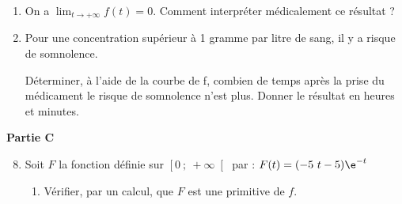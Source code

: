 \begin{exercice_cours}[\quad]{}
\begin{enumerate}
	\begin{enumerate}
		\item Déterminer $f'(t)$.\hfill\reponseLigne[7cm]{}   
		
		\item Résoudre sur $\left[0~;~+\infty\right[$ : $f'(t)=0$ \hfill\reponseLigne[7cm]{}   
		
		\item \hspace*{4.2cm}$f'(t)\geq 0$ \hfill \reponseLigne[7cm]{}    
		
		\item Compléter alors le tableau de variation complet de la fonction $f$ sur $\left[0~;~+\infty\right[$ :
		
		{\it \small On fera figurer les valeurs au bout des flèches}
		
		\begin{center}
		\end{center}
		\end{enumerate}	
	
	\item On a ${\displaystyle\lim_{t\rightarrow+\infty}f(t)=0}$. Comment interpréter médicalement ce résultat ?    

	\begin{blocvisiblex}[height=2]
{\quad}
\end{blocvisiblex}
	    
	\item Pour une concentration supérieur à 1 gramme par litre de sang, il y a risque de somnolence.
	
	Déterminer, à l’aide de la courbe de f, combien de temps après la prise du médicament le risque de somnolence n’est plus. Donner le résultat en heures et minutes.    

	    \begin{blocvisiblex}[height=2]
{\quad}
\end{blocvisiblex}
\end{enumerate}

{\bf Partie C}

\begin{enumerate}
	\setcounter{enumi}{7}
	\item Soit $F$ la fonction définie sur $\left[0~;~+\infty\right[$ par : $F(t)=(-5~t-5)\e^{-t}$
	\begin{enumerate}
		\item Vérifier, par un calcul, que $F$ est une primitive de $f$.     


\end{enumerate}
\end{enumerate}
\end{exercice_cours}
